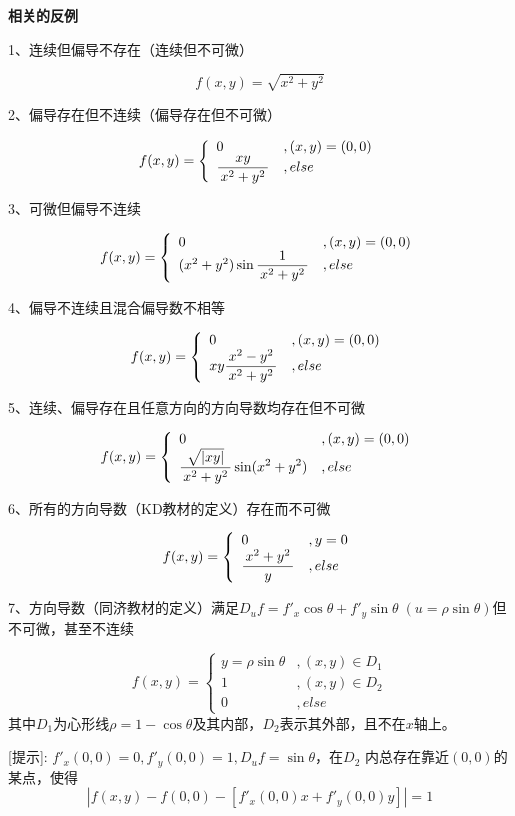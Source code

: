 \begin{shaded}
{\bf 相关的反例}

1、连续但偏导不存在（连续但不可微）

$$f(x,y)=\sqrt{x^2+y^2}$$

2、偏导存在但不连续（偏导存在但不可微）

$$
f(x,y)=\left\{\begin{array}{ll}
0 & ,(x,y)=(0,0)\\
\displaystyle\frac{\,{xy}\,}{\,{x^2+y^2}\,}& ,else
\end{array}\right.
$$

3、可微但偏导不连续

$$
f(x,y)=\left\{\begin{array}{ll}
0 & ,(x,y)=(0,0)\\
(x^2+y^2)\sin\displaystyle\frac{\,{1}\,}{\,{x^2+y^2}\,}& ,else
\end{array}\right.
$$

4、偏导不连续且混合偏导数不相等

$$
f(x,y)=\left\{\begin{array}{ll}
0 & ,(x,y)=(0,0)\\
xy\displaystyle\frac{\,{x^2-y^2}\,}{\,{x^2+y^2}\,}& ,else
\end{array}\right.
$$

5、连续、偏导存在且任意方向的方向导数均存在但不可微

$$
f(x,y)=\left\{\begin{array}{ll}
0 & ,(x,y)=(0,0)\\
\displaystyle\frac{\,{\sqrt{|xy|}}\,}{\,{x^2+y^2}\,}\sin(x^2+y^2)& ,else
\end{array}\right.
$$

6、所有的方向导数（KD教材的定义）存在而不可微

$$
f(x,y)=\left\{\begin{array}{ll}
0 & ,y=0\\
\displaystyle\frac{\,{x^2+y^2}\,}{\,{y}\,}& ,else
\end{array}\right.
$$

7、方向导数（同济教材的定义）满足$D_uf=f'_x\cos\theta+f'_y\sin\theta\;
(u=\rho\sin\theta)$但不可微，甚至不连续

$$
f(x,y)=\left\{\begin{array}{ll}
y=\rho\sin\theta & ,(x,y)\in D_1\\
1& ,(x,y)\in D_2\\
0& ,else
\end{array}\right.
$$
其中$D_1$为心形线$\rho=1-\cos\theta$及其内部，$D_2$表示其外部，且不在$x$轴上。

[提示]: $f'_x(0,0)=0,f'_y(0,0)=1,D_uf=\sin\theta$，在$D_2$
内总存在靠近$(0,0)$的某点，使得
$$|f(x,y)-f(0,0)-[f'_x(0,0)x+f'_y(0,0)y]|=1$$


\end{shaded}

